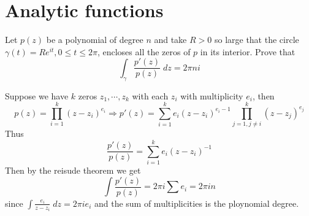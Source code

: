 \section{Analytic functions}\label{p:analytic-functions}

\begin{problem}
Let $p(z)$ be a polynomial of degree $n$ and take $R>0$ so large that the circle $\gamma(t) = Re^{it}, 0\leq t \leq 2\pi$, encloses all the zeros of $p$ in its interior. Prove that 
    \[\int_\gamma \frac{p'(z)}{p(z)}\; dz = 2\pi ni\]
\begin{solution}
Suppose we have $k$ zeros $z_1,\cdots, z_k$ with each $z_i$ with multiplicity $e_i$, then $$p(z) = \prod_{i=1}^k (z-z_i)^{e_i} \Rightarrow p'(z) = \sum_{i=1}^k e_i(z-z_i)^{e_i-1}\prod_{j=1,j\ne i}^{k}(z-z_j)^{e_j}$$
    Thus 
    $$\frac{p'(z)}{p(z)} = \sum_{i=1}^k e_i(z-z_i)^{-1}$$
    Then by the reisude theorem we get 
    \[\int \frac{p'(z)}{p(z)} = 2\pi i \sum e_i = 2\pi i n\]
    since $\int \frac{e_i}{z-z_i} \; dz = 2\pi i e_i$ and the sum of multiplicities is the ploynomial degree.
\end{solution}
\end{problem}

